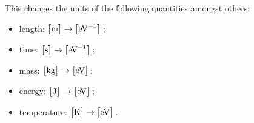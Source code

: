 This changes the units of the following quantities amongst others:

\begin{itemize}
\item length: $\big[\mathrm{m}\big]\rightarrow \big[\textrm{eV}^{-1}\big]$\,;
\item time: $\big[\mathrm{s}\big]\rightarrow \big[\textrm{eV}^{-1}\big]$\,;
\item mass: $\big[\mathrm{kg}\big]\rightarrow \big[\textrm{eV}\big]$\,;
\item energy: $\big[\mathrm{J}\big]\rightarrow \big[\textrm{eV}\big]$\,;
\item temperature: $\big[\mathrm{K}\big]\rightarrow \big[\textrm{eV}\big]$\,.
\end{itemize}



